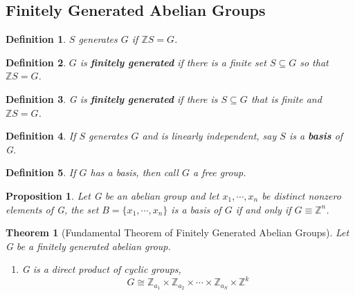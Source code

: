 \documentclass[12pt]{article}
\newtheorem{definition}{Definition}[subsection]
\newtheorem{theorem}{Theorem}[subsection]
\newtheorem{proposition}{Proposition}[subsection]
\begin{document}
                    
                    
                    \subsection{Finitely Generated Abelian Groups}
                    \begin{definition}
                    	$S$ generates $G$ if $\mathbb{Z}S = G$.
                    \end{definition}
                    
                    \begin{definition}
                    	$G$ is \textbf{finitely generated} if there is a finite set $S \subseteq G$ so that $\mathbb{Z}S = G$.
                    \end{definition}
                    
                    \begin{definition}
                    	G is \textbf{finitely generated} if there is  $S \subseteq G$ that is finite and $\mathbb{Z}S = G$.
                    \end{definition}
                    
                    \begin{definition}
                    	If $S$ generates $G$ and is linearly independent, say $S$ is a \textbf{basis} of G.
                    \end{definition}
                    
                    \begin{definition}
                    	If $G$ has a basis, then call $G$ a free group.
                    \end{definition}
                    
                    \begin{proposition}
                    	Let G be an abelian group and let $x_1, \cdots , x_n$ be distinct nonzero elements of G, the set $B =\{x_1,\cdots ,x_n\} $ is a basis of $G$ if and only if $G \equiv \mathbb{Z}^n$.
                    \end{proposition}
                    
                    \begin{theorem}[Fundamental Theorem of Finitely Generated Abelian Groups]
                    	Let G be a finitely generated abelian group.
                    	\begin{enumerate}
                    		\item G is a direct product of cyclic groups,
                    		\[G \cong \mathbb{Z}_{a_1} \times \mathbb{Z}_{a_2} \times \cdots \times \mathbb{Z}_{a_S} \times \mathbb{Z}^k\]
                    	\end{enumerate}
                    \end{theorem}
            
\end{document}

